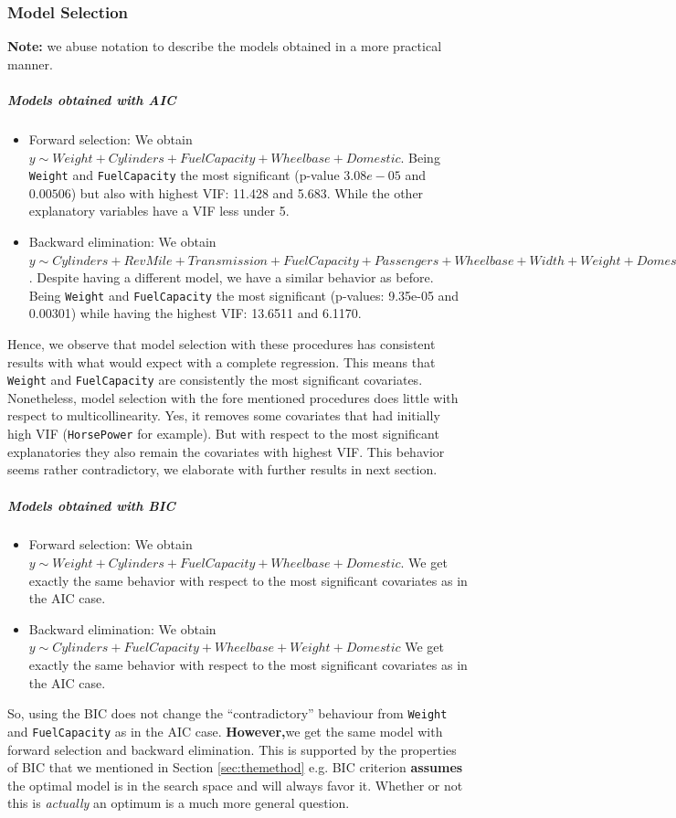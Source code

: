 \documentclass[12pt]{article}
\begin{document}
\subsubsection{Model Selection}\label{ssec:selecfull}
\textbf{Note:} we abuse notation to describe the models obtained in a more practical manner.
\subparagraph{Models obtained with AIC}
\begin{itemize}
\item Forward selection: We obtain $y \sim Weight + Cylinders + FuelCapacity + 
    Wheelbase + Domestic$. Being \texttt{Weight} and \texttt{FuelCapacity} the most significant (p-value $3.08e-05$ and $0.00506$) but also with highest VIF: 11.428 and 5.683. While the other explanatory variables have a VIF less under 5.
\item Backward elimination: We obtain $y \sim Cylinders + RevMile + Transmission + 
    FuelCapacity + Passengers + Wheelbase + Width + Weight + 
    Domestic$. Despite having a different model, we have a similar behavior as before. Being \texttt{Weight} and \texttt{FuelCapacity} the most significant 
(p-values: 9.35e-05 and  0.00301) while having the highest VIF:  13.6511 and 6.1170.
\end{itemize}

Hence, we observe that model selection with these procedures has consistent results with what would expect with a complete regression. This means that
\texttt{Weight} and \texttt{FuelCapacity} are consistently the most significant
covariates. Nonetheless, model selection with the fore mentioned procedures
does little with respect to multicollinearity. Yes, it removes some
covariates that had initially high VIF (\texttt{HorsePower} for example). But
with respect to the most significant explanatories they also remain the covariates
with highest VIF. This behavior seems rather contradictory, we elaborate with further results in next section.

\subparagraph{Models obtained with BIC}
\begin{itemize}
\item Forward selection: We obtain $y \sim Weight + Cylinders + FuelCapacity + 
    Wheelbase + Domestic$. We get exactly the same behavior with respect
    to the most significant covariates as in the AIC case.
\item Backward elimination: We obtain $y \sim Cylinders + FuelCapacity + Wheelbase + 
    Weight + Domestic$ We get exactly the same behavior with respect
    to the most significant covariates as in the AIC case.
\end{itemize}
So, using the BIC does not change the ``contradictory'' behaviour from 
\texttt{Weight} and \texttt{FuelCapacity} as in the AIC case.
\textbf{However,}we get the same model with forward selection and backward elimination.
This is supported by the properties of BIC that we mentioned in Section \ref{sec:themethod} e.g.
BIC criterion \textbf{assumes} the optimal model is in the search space and will always favor it.
Whether or not this is \emph{actually} an optimum is a much more general question.
\end{document}
